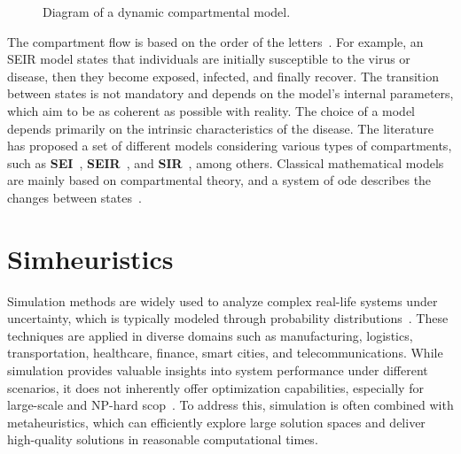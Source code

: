 \begin{figure}[!ht]
{

	} \caption{Diagram of a dynamic compartmental model.}
	\label{fig:dynamicmodel}
\end{figure}

The compartment flow is based on the order of the letters~\citep{amaku:2014}.
For example, an SEIR model states that individuals are initially susceptible to
the virus or disease, then they become exposed, infected, and finally recover.
The transition between states is not mandatory and depends on the model's
internal parameters, which aim to be as coherent as possible with reality. The
choice of a model depends primarily on the intrinsic characteristics of the
disease. The literature has proposed a set of different models considering
various types of compartments, such as \textbf{SEI}~\cite{Scoglio2021,
	Puntipa2023}, \textbf{SEIR}~\cite{Scoglio2021, Puntipa2023, Meng2023,
	da-silva:2020}, and \textbf{SIR}~\cite{Umar2022, Prasetyo2023, Srivastav2023},
among others.  Classical mathematical models are mainly based on compartmental
theory, and a system of \gls{ode} describes the changes between
states~\citep{da-silva:2020}.

\section{Simheuristics}\label{sec:simheuristics}

Simulation methods are widely used to analyze complex real-life systems under
uncertainty, which is typically modeled through probability
distributions~\cite{lucas:2015}. These techniques are applied in diverse domains
such as manufacturing, logistics, transportation, healthcare, finance, smart
cities, and telecommunications. While simulation provides valuable insights into
system performance under different scenarios, it does not inherently offer
optimization capabilities, especially for large-scale and NP-hard
\gls{scop}~\cite{juan:2022}. To address this, simulation is often combined with
metaheuristics, which can efficiently explore large solution spaces and deliver
high-quality solutions in reasonable computational times.

